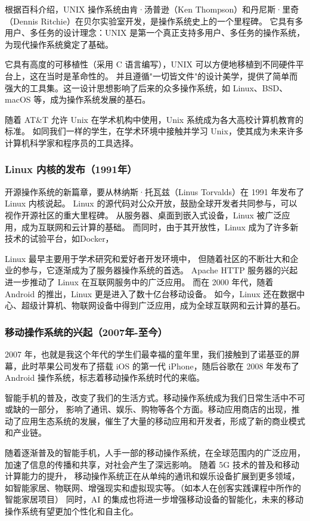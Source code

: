 \documentclass[UTF8]{homework.cls}
\begin{document}
\begin{homeworkProblem}
根据百科介绍，UNIX 操作系统由肯·汤普逊（Ken Thompson）和丹尼斯·里奇（Dennis Ritchie）在贝尔实验室开发，是操作系统史上的一个里程碑。
它具有多用户、多任务的设计理念：UNIX 是第一个真正支持多用户、多任务的操作系统，为现代操作系统奠定了基础。

它具有高度的可移植性（采用 C 语言编写），UNIX 可以方便地移植到不同硬件平台上，这在当时是革命性的。
并且遵循"一切皆文件"的设计美学，提供了简单而强大的工具集。这一设计思想影响了后来的众多操作系统，如 Linux、BSD、macOS 等，成为操作系统发展的基石。

随着 AT\&T 允许 Unix 在学术机构中使用，Unix 系统成为各大高校计算机教育的标准。
如同我们一样的学生，在学术环境中接触并学习 Unix，使其成为未来许多计算机科学家和程序员的工具选择。

\subsubsection{Linux 内核的发布（1991年）}

开源操作系统的新篇章，要从林纳斯·托瓦兹（Linus Torvalds）在 1991 年发布了 Linux 内核说起。
Linux 的源代码对公众开放，鼓励全球开发者共同参与，可以视作开源社区的重大里程碑。
从服务器、桌面到嵌入式设备，Linux 被广泛应用，成为互联网和云计算的基础。
而同时，由于其开放性，Linux 成为了许多新技术的试验平台，如Docker，

Linux 最早主要用于学术研究和爱好者开发环境中，
但随着社区的不断壮大和企业的参与，它逐渐成为了服务器操作系统的首选。
Apache HTTP 服务器的兴起进一步推动了 Linux 在互联网服务中的广泛应用。
而在 2000 年代，随着 Android 的推出，Linux 更是进入了数十亿台移动设备。
如今，Linux 还在数据中心、超级计算机、物联网设备中得到广泛应用，成为全球互联网和云计算的基石。

\subsubsection{移动操作系统的兴起（2007年-至今）}

2007 年，也就是我这个年代的学生们最幸福的童年里，我们接触到了诺基亚的屏幕，此时苹果公司发布了搭载 iOS 的第一代 iPhone，随后谷歌在 2008 年发布了 Android 操作系统，标志着移动操作系统时代的来临。

智能手机的普及，改变了我们的生活方式。移动操作系统成为我们日常生活中不可或缺的一部分，
影响了通讯、娱乐、购物等各个方面。移动应用商店的出现，推动了应用生态系统的发展，催生了大量的移动应用和开发者，形成了新的商业模式和产业链。

随着逐渐普及的智能手机，人手一部的移动操作系统，在全球范围内的广泛应用，加速了信息的传播和共享，对社会产生了深远影响。
随着 5G 技术的普及和移动计算能力的提升，
移动操作系统正在从单纯的通讯和娱乐设备扩展到更多领域，
如智能家居、物联网、增强现实和虚拟现实等。（如本人在创客实践课程中所作的智能家居项目）
同时，AI 的集成也将进一步增强移动设备的智能化，未来的移动操作系统有望更加个性化和自主化。

\end{homeworkProblem}
\end{document}
